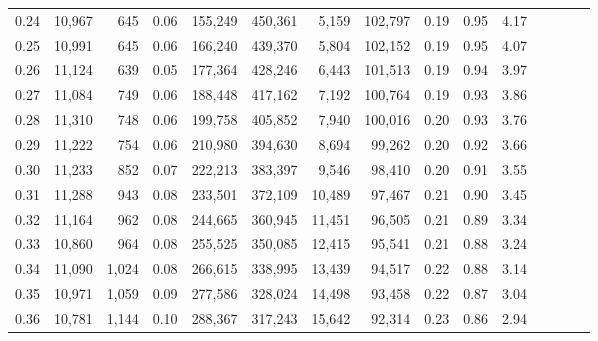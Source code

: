 \begin{tabular}{rrrcrrrrrrrrrrr}
0.24 &  10,967 &    645 &                                       0.06 &  155,249 &  450,361 &    5,159 &  102,797 &  0.19 &  0.95 &                         4.17 \\
0.25 &  10,991 &    645 &                                       0.06 &  166,240 &  439,370 &    5,804 &  102,152 &  0.19 &  0.95 &                         4.07 \\
0.26 &  11,124 &    639 &                                       0.05 &  177,364 &  428,246 &    6,443 &  101,513 &  0.19 &  0.94 &                         3.97 \\
0.27 &  11,084 &    749 &                                       0.06 &  188,448 &  417,162 &    7,192 &  100,764 &  0.19 &  0.93 &                         3.86 \\
0.28 &  11,310 &    748 &                                       0.06 &  199,758 &  405,852 &    7,940 &  100,016 &  0.20 &  0.93 &                         3.76 \\
0.29 &  11,222 &    754 &                                       0.06 &  210,980 &  394,630 &    8,694 &   99,262 &  0.20 &  0.92 &                         3.66 \\
0.30 &  11,233 &    852 &                                       0.07 &  222,213 &  383,397 &    9,546 &   98,410 &  0.20 &  0.91 &                         3.55 \\
0.31 &  11,288 &    943 &                                       0.08 &  233,501 &  372,109 &   10,489 &   97,467 &  0.21 &  0.90 &                         3.45 \\
0.32 &  11,164 &    962 &                                       0.08 &  244,665 &  360,945 &   11,451 &   96,505 &  0.21 &  0.89 &                         3.34 \\
0.33 &  10,860 &    964 &                                       0.08 &  255,525 &  350,085 &   12,415 &   95,541 &  0.21 &  0.88 &                         3.24 \\
0.34 &  11,090 &  1,024 &                                       0.08 &  266,615 &  338,995 &   13,439 &   94,517 &  0.22 &  0.88 &                         3.14 \\
0.35 &  10,971 &  1,059 &                                       0.09 &  277,586 &  328,024 &   14,498 &   93,458 &  0.22 &  0.87 &                         3.04 \\
0.36 &  10,781 &  1,144 &                                       0.10 &  288,367 &  317,243 &   15,642 &   92,314 &  0.23 &  0.86 &                         2.94 \\

\end{tabular}
